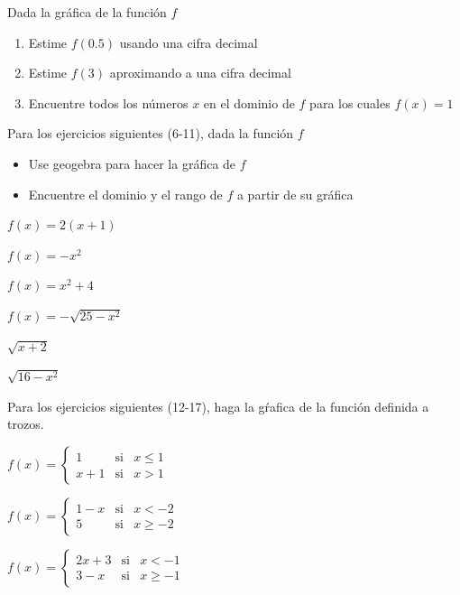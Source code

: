 \documentclass[10pt,twoside]{article}
\begin{document}
\begin{enumerate}
\begin{minipage}{.45\textwidth}
  \end{minipage}\hfill
  \begin{minipage}{.45\textwidth}
    \item Dada la gráfica de la función $ f $
    \begin{enumerate}
      \item Estime $ f(0.5) $ usando una cifra decimal
      \item Estime $ f(3) $ aproximando a una cifra decimal
      \item Encuentre todos los números $ x $ en el dominio de $ f $ para los cuales $ f(x)=1 $
    \end{enumerate}
  \end{minipage}
  Para los ejercicios siguientes (6-11), dada la función $ f $
  \begin{itemize}
     \item Use geogebra para hacer la gráfica de $ f $
     \item Encuentre el dominio y el rango de $ f $ a partir de su gráfica
   \end{itemize}
   \begin{multicols}{2}
   \item $ f(x)=2(x+1) $  \item $ f(x)=-x^2 $
   \item $ f(x)=x^2+4 $ \item $ f(x)=-\sqrt{25-x^2} $
   \item $ \sqrt{x+2} $ \item $ \sqrt{16-x^2} $
   \end{multicols}
Para los ejercicios siguientes (12-17), haga la gŕafica de la función definida a trozos.
\begin{multicols}{2}
  \item $ f(x)=\left\{ \begin{array}{lcl}
    1 & \mbox{si} & x\leq1\\
    x+1 & \mbox{si} & x>1
  \end{array} \right. $
  \item $ f(x)=\left\{\begin{array}{lcl}
    1-x & \mbox{si} & x<-2\\
    5 & \mbox{si}& x\geq-2
  \end{array}\right. $
  \item $ f(x)=\left\{\begin{array}{lcl}
    2x+3 & \mbox{si} & x<-1\\
    3-x & \mbox{si} & x\geq-1
  \end{array} \right.$

\end{multicols}
\end{enumerate}
\end{document}
